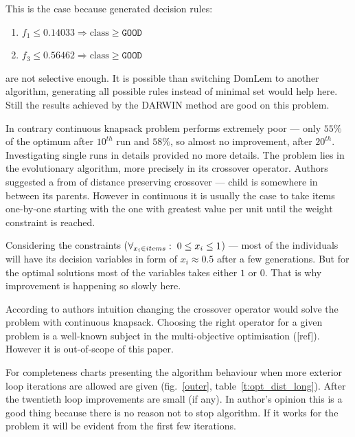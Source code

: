 This is the case because generated decision rules:
\begin{enumerate}
\item $f_1 \le 0.14033 \Rightarrow \text{class} \ge \texttt{GOOD}$
\item $f_3 \le 0.56462 \Rightarrow \text{class} \ge \texttt{GOOD}$
\end{enumerate}
are not selective enough. It is possible than switching DomLem to another
algorithm, generating all possible rules instead of minimal set would help
here. Still the results achieved by the DARWIN method are good on this
problem.

In contrary continuous knapsack problem performs extremely poor --- only
$55\%$ of the optimum after $10^{th}$ run and $58\%$, so almost no
improvement, after $20^{th}$. Investigating single runs in details provided no
more details. The problem lies in the evolutionary algorithm, more precisely
in its crossover operator. Authors suggested a from of distance preserving
crossover --- child is somewhere in between its parents. However in continuous
it is usually the case to take items one-by-one starting with the one with
greatest value per unit until the weight constraint is reached.

Considering the constraints ($ \forall_{x_i \in items}: \hspace{0.1cm} 0 \leq
x_i \leq 1 $) --- most of the individuals will have its decision variables in
form of $x_i \approx 0.5$ after a few generations. But for the optimal
solutions most of the variables takes either $1$ or $0$. That is why
improvement is happening so slowly here.

According to authors intuition changing the crossover operator would solve the
problem with continuous knapsack. Choosing the right operator for a given
problem is a well-known subject in the multi-objective optimisation
([ref]). However it is out-of-scope of this paper.

For completeness charts presenting the algorithm behaviour when more exterior
loop iterations are allowed are given (fig.~\ref{outer},
table~\ref{t:opt_dist_long}). After the twentieth loop improvements are small
(if any). In author's opinion this is a good thing because there is no reason
not to stop algorithm. If it works for the problem it will be evident from the
first few iterations.


